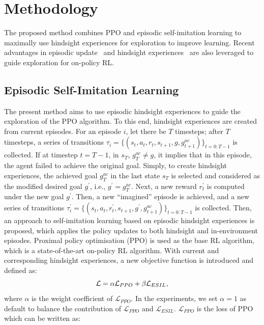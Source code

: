 \section{Methodology}
\label{sec:method}
The proposed method combines PPO and episodic self-imitation learning to maximally use hindsight experiences for exploration to improve learning. {Recent advantages in episodic update~\cite{lee2019sample} and hindsight experiences~\cite{andrychowicz2017hindsight} are also leveraged} to guide exploration for on-policy RL. 

\subsection{Episodic Self-Imitation Learning}
The present method aims to use episodic hindsight experiences to guide the exploration of the PPO algorithm. To this end, hindsight experiences are created from current episodes. For an episode $i$, let there be $T$ timesteps; after $T$ timesteps, a series of transitions $\tau_i =\{ (s_{t}, a_{t}, r_{t}, s_{t+1}, g, g^{ac}_{t+1})\}_{t=0:T-1}$ is collected. If at timestep $t=T-1$, in $s_{T}$, $g^{ac}_{T} \neq g$, it implies that in this episode, the agent failed to achieve the original goal. Simply, to create hindsight experiences, {the achieved goal $g^{ac}_{T}$ in the last state $s_{T}$ is selected and considered as the modified desired goal $g^{\prime}$, i.e., $g^\prime = g^{ac}_{T}$.} Next, a new reward $r_{t}^{\prime}$ is computed under the new goal $g^\prime$. Then, {a new ``imagined'' episode is achieved}, and a new series of transitions $\tau_i^{\prime} = \{(s_{t}, a_{t}, r_{t}^{\prime},s_{t+1}, g^\prime, g^{ac}_{t+1})\}_{t=0:T-1}$ is collected.
Then, an approach to self-imitation learning based on episodic hindsight experiences is proposed, which applies the policy updates to both hindsight and in-environment episodes. Proximal policy optimisation (PPO) is used as the base RL algorithm, which is a state-of-the-art on-policy RL algorithm. With current and corresponding hindsight experiences, a new objective function is introduced and defined as:
\begin{equation}
  \centering
  \mathcal{L} = \alpha\mathcal{L}_{PPO} + \beta\mathcal{L}_{ESIL},
  \label{eq:loss}
\end{equation}
where $\alpha$ is the weight coefficient of $\mathcal{L}_{PPO}$. In the experiments, we set $\alpha=1$ as default {to balance the contribution of $\mathcal{L}_{PPO}$ and $\mathcal{L}_{ESIL}$}. $\mathcal{L}_{PPO}$ is the loss of PPO which can be written as:
